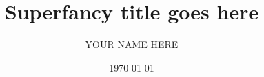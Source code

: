 \documentclass[10pt, a4paper, oneside]{book}
\title{Superfancy title goes here}                                    %
\author{YOUR NAME HERE}                                             %
\date{\today}                                                         %
\begin{document}
\frontmatter
\let\cleardoublepage\clearpage

%



\tableofcontents

\mainmatter


\end{document}
